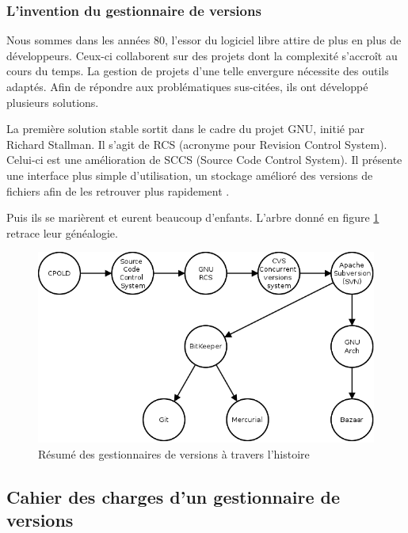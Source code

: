 \subsubsection{L'invention du gestionnaire de versions}

Nous sommes dans les années 80, l'essor du logiciel libre attire de plus en plus de développeurs. 
Ceux-ci collaborent sur des projets dont la complexité s'accroît au cours du temps. 
La gestion de projets d'une telle envergure nécessite des outils adaptés. 
Afin de répondre aux problématiques sus-citées, ils ont développé plusieurs solutions. 

La première solution stable sortit dans le cadre du projet GNU, initié par Richard Stallman. Il s'agit de RCS (acronyme pour Revision Control System). 
Celui-ci est une amélioration de SCCS (Source Code Control System). Il présente une interface plus simple d'utilisation, un stockage amélioré des versions de fichiers afin de les retrouver plus rapidement . 

Puis ils se marièrent et eurent beaucoup d'enfants. L'arbre donné en figure \ref{fig:chronologie} retrace leur généalogie. 


\begin{figure}[h!]
  \centerline{
  \includegraphics[width=14cm]{images/chronologie.png}}
  \caption{Résumé des gestionnaires de versions à travers l'histoire}
  \label{fig:chronologie}
\end{figure}


\subsection{Cahier des charges d'un gestionnaire de versions}


